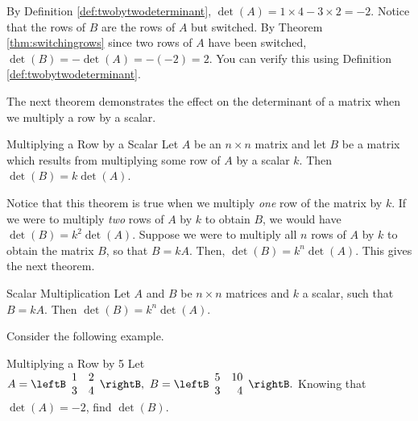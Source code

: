 \begin{solution}
By Definition \ref{def:twobytwodeterminant}, 
$\det \left(A\right) = 1 \times 4 - 3 \times 2 = -2$. 
Notice that the rows of $B$ are the rows of $A$ but switched. 
By Theorem \ref{thm:switchingrows} since two rows of $A$ have been switched,
$\det \left(B\right) = - \det \left(A\right) = - \left(-2\right) = 2$.
You can verify this using Definition \ref{def:twobytwodeterminant}. 
\end{solution}

The next theorem demonstrates the effect on the determinant of a matrix when we multiply
a row by a scalar.

\begin{theorem}{Multiplying a Row by a Scalar}\label{thm:multiplyingrowbyscalar}
Let $A$ be an $n\times n$ matrix and let $B$ be a matrix
which results from multiplying some row of $A$ by a scalar $k$. Then $\det
\left( B\right) = k \det \left( A\right) $.
\end{theorem}

Notice that this theorem is true when we multiply {\em one\em} row of the matrix by $k$.
If we were to multiply {\em two\em} rows of $A$ by $k$ to obtain $B$, we would have
$\det \left(B\right) = k^2 \det \left(A\right)$.
Suppose we were to multiply all $n$ rows of $A$ by $k$ to obtain the matrix $B$, so that 
$B = kA$. Then, $\det \left(B\right) = k^n \det \left(A\right)$. This gives the next theorem.

\begin{theorem}{Scalar Multiplication}\label{thm:scalarmultdet}
Let $A$ and $B$ be $n \times n$ matrices and $k$ a scalar, such that $B = kA$. Then $\det(B) = k^n \det(A)$.
\end{theorem}

Consider the following example.

\begin{example}{Multiplying a Row by 5}\label{exa:5timesrow}
Let $A=\leftB
\begin{array}{rr}
1 & 2 \\
3 & 4
\end{array}
\rightB ,\ B=\leftB
\begin{array}{rr}
5 & 10 \\
3 & 4
\end{array}
\rightB .$ 
Knowing that $\det \left( A \right) =-2$, find  $\det \left( B \right) $.
\end{example}

